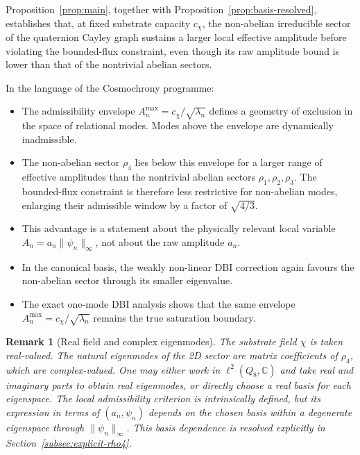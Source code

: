 \documentclass[11pt,a4paper]{article}
\newtheorem{remark}{Remark}
\begin{document}
    Proposition~\ref{prop:main}, together with
    Proposition~\ref{prop:basis-resolved}, establishes that, at fixed substrate capacity
    $c_\chi$, the non-abelian irreducible sector of the quaternion Cayley graph sustains
    a larger local effective amplitude before violating the bounded-flux constraint,
    even though its raw amplitude bound is lower than that of the nontrivial abelian
    sectors.

    In the language of the Cosmochrony programme:
    \begin{itemize}
      \item The admissibility envelope $A_n^{\max} = c_\chi / \sqrt{\lambda_n}$ defines a
      geometry of exclusion in the space of relational modes.
      Modes above the envelope are dynamically inadmissible.
      \item The non-abelian sector $\rho_4$ lies below this envelope for a larger
      range of effective amplitudes than the nontrivial abelian sectors
      $\rho_1, \rho_2, \rho_3$.
      The bounded-flux constraint is therefore less restrictive for non-abelian modes,
      enlarging their admissible window by a factor of $\sqrt{4/3}$.
      \item This advantage is a statement about the physically relevant local variable
      $A_n = a_n \|\psi_n\|_\infty$, not about the raw amplitude $a_n$.
      \item In the canonical basis, the weakly non-linear DBI correction again favours
      the non-abelian sector through its smaller eigenvalue.
      \item The exact one-mode DBI analysis shows that the same envelope
      $A_n^{\max} = c_\chi/\sqrt{\lambda_n}$ remains the true saturation boundary.
    \end{itemize}

    \begin{remark}[Real field and complex eigenmodes]
      The substrate field $\chi$ is taken real-valued.
      The natural eigenmodes of the 2D sector are matrix coefficients of $\rho_4$,
      which are complex-valued.
      One may either work in $\ell^2(Q_8,\mathbb{C})$ and take real and imaginary parts to
      obtain real eigenmodes, or directly choose a real basis for each eigenspace.
      The local admissibility criterion is intrinsically defined, but its expression in
      terms of $(a_n,\psi_n)$ depends on the chosen basis within a degenerate eigenspace
      through $\|\psi_n\|_\infty$.
      This basis dependence is resolved explicitly in
      Section~\ref{subsec:explicit-rho4}.
    \end{remark}
\end{document}
